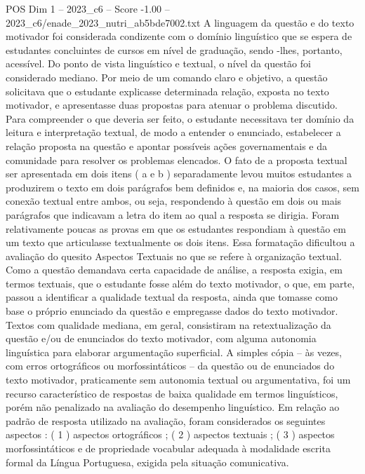 \begin{textsample}{POS Dim 1 – 2023\_c6 – Score -1.00 – 2023\_c6/enade\_2023\_nutri\_ab5bde7002.txt}
A linguagem da questão e do texto motivador foi considerada condizente com o domínio linguístico que se espera de estudantes concluintes de cursos em nível de graduação, sendo -lhes, portanto, acessível.
Do ponto de vista linguístico e textual, o nível da questão foi considerado mediano.
Por meio de um comando claro e objetivo, a questão solicitava que o estudante explicasse determinada relação, exposta no texto motivador, e apresentasse duas propostas para atenuar o problema discutido.
Para compreender o que deveria ser feito, o estudante necessitava ter domínio da leitura e interpretação textual, de modo a entender o enunciado, estabelecer a relação proposta na questão e apontar possíveis ações governamentais e da comunidade para resolver os problemas elencados.
O fato de a proposta textual ser apresentada em dois itens ( a e b ) separadamente levou muitos estudantes a produzirem o texto em dois parágrafos bem definidos e, na maioria dos casos, sem conexão textual entre ambos, ou seja, respondendo à questão em dois ou mais parágrafos que indicavam a letra do item ao qual a resposta se dirigia.
Foram relativamente poucas as provas em que os estudantes respondiam à questão em um texto que articulasse textualmente os dois itens.
Essa formatação dificultou a avaliação do quesito Aspectos Textuais no que se refere à organização textual.
Como a questão demandava certa capacidade de análise, a resposta exigia, em termos textuais, que o estudante fosse além do texto motivador, o que, em parte, passou a identificar a qualidade textual da resposta, ainda que tomasse como base o próprio enunciado da questão e empregasse dados do texto motivador.
Textos com qualidade mediana, em geral, consistiram na retextualização da questão e/ou de enunciados do texto motivador, com alguma autonomia linguística para elaborar argumentação superficial.
A simples cópia – às vezes, com erros ortográficos ou morfossintáticos – da questão ou de enunciados do texto motivador, praticamente sem autonomia textual ou argumentativa, foi um recurso característico de respostas de baixa qualidade em termos linguísticos, porém não penalizado na avaliação do desempenho linguístico.
Em relação ao padrão de resposta utilizado na avaliação, foram considerados os seguintes aspectos : ( 1 ) aspectos ortográficos ; ( 2 ) aspectos textuais ; ( 3 ) aspectos morfossintáticos e de propriedade vocabular adequada à modalidade escrita formal da Língua Portuguesa, exigida pela situação comunicativa.

\end{textsample}
